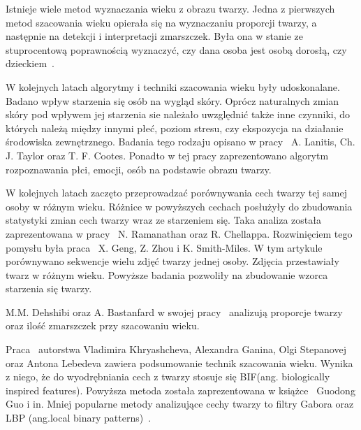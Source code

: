 \documentclass[a4paper,twoside,12pt]{book}
\begin{document}
    Istnieje wiele metod wyznaczania wieku z obrazu twarzy.
    Jedna z pierwszych metod szacowania wieku opierała się na wyznaczaniu proporcji twarzy, a następnie na detekcji i
    interpretacji zmarszczek.
    Była ona w stanie ze stuprocentową poprawnością wyznaczyć, czy dana osoba jest osobą
    dorosłą, czy
    dzieckiem~\cite{kwonLobo}.

    W kolejnych latach algorytmy i techniki szacowania wieku były udoskonalane.
    Badano wpływ starzenia się osób na
    wygląd skóry.
    Oprócz naturalnych
    zmian skóry pod wpływem jej starzenia sie należało uwzględnić także inne
    czynniki, do których należą między innymi
    płeć, poziom stresu, czy ekspozycja na działanie środowiska zewnętrznego.
    Badania tego rodzaju opisano w pracy~\cite{lanitisTaylor} A. Lanitis, Ch. J. Taylor oraz T. F. Cootes.
    Ponadto w tej pracy zaprezentowano algorytm rozpoznawania płci, emocji, osób na podstawie obrazu twarzy.

    W kolejnych latach zaczęto przeprowadzać porównywania cech twarzy tej samej osoby w różnym wieku.
    Różnice w powyższych cechach posłużyły do zbudowania statystyki zmian cech twarzy wraz ze starzeniem się.
    Taka analiza została zaprezentowana w pracy~\cite{ramanthanChelappa} N. Ramanathan oraz R. Chellappa.
    Rozwinięciem tego pomysłu była praca~\cite{gengZhou} X. Geng, Z. Zhou i K. Smith-Miles.
    W tym artykule porównywano sekwencje wielu zdjęć twarzy jednej osoby.
    Zdjęcia przestawiały twarz w różnym wieku.
    Powyższe badania pozwoliły na zbudowanie wzorca starzenia się twarzy.

    M.M. Dehshibi oraz A. Bastanfard w swojej pracy~\cite{dehshibiBastard} analizują proporcje twarzy oraz ilość
    zmarszczek przy szacowaniu wieku.

    Praca~\cite{khryashchevGanin} autorstwa
    Vladimira Khryashcheva, Alexandra Ganina, Olgi Stepanovej oraz
    Antona Lebedeva zawiera podsumowanie technik szacowania wieku.
    Wynika z niego, że do wyodrębniania cech z twarzy stosuje się BIF(ang. biologically inspired features).
    Powyższa metoda została zaprezentowana w książce~\cite{bif} Guodong Guo i in.
    Mniej popularne metody analizujące cechy twarzy to filtry Gabora oraz LBP (ang.local binary patterns)~\cite{lbp}.
\end{document}
